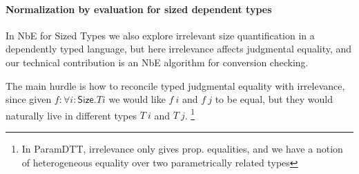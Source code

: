 \documentclass{book}
\begin{document}
\paragraph{Normalization by evaluation for sized dependent types}
    \item In NbE for Sized Types we also explore irrelevant size
    quantification in a dependently typed language, but here
    irrelevance affects judgmental equality, and our technical
    contribution is an NbE algorithm for conversion checking.

    The main hurdle is how to reconcile typed judgmental equality with
    irrelevance, since given $f : \forall i : \mathsf{Size}. T i$ we would like
    $f~i$ and $f~j$ to be equal, but they would naturally live in
    different types $T~i$ and $T~j$.
    \footnote{In ParamDTT, irrelevance only gives prop. equalities,
      and we have a notion of heterogeneous equality over two
      parametrically related types}
\end{document}
